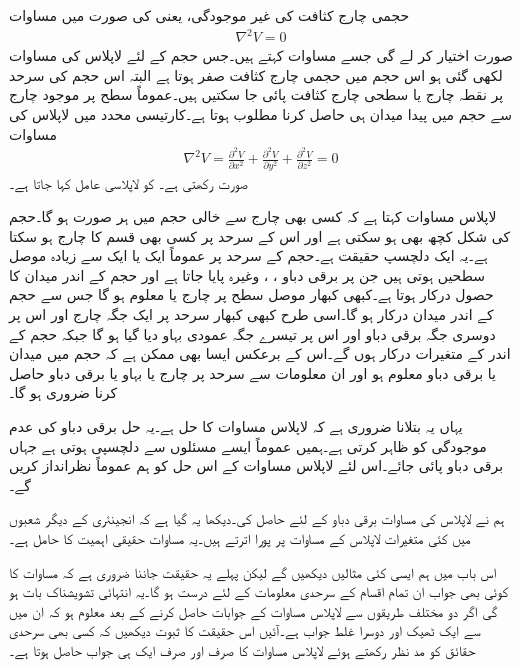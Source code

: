 حجمی چارج کثافت کی غیر موجودگی، یعنی  کی صورت میں مساوات 
\begin{align}\label{مساوات_لاپلاس_لاپلاس_نقطہ_شکل}
\nabla^2 V=0
\end{align}
صورت اختیار کر لے گی جسے  مساوات کہتے ہیں۔جس حجم کے لئے لاپلاس کی مساوات لکھی گئی ہو اس حجم میں حجمی چارج کثافت صفر ہوتا ہے البتہ اس حجم کی سرحد پر نقطہ چارج یا سطحی چارج کثافت پائی جا سکتیں ہیں۔عموماً سطح پر موجود چارج سے حجم میں پیدا میدان ہی حاصل کرنا مطلوب ہوتا ہے۔کارتیسی محدد میں لاپلاس کی مساوات
\begin{align}\label{مساوات_لاپلاس_لاپلاس_کارتیسی_شکل}
\nabla^2 V=\frac{\partial^2 V}{\partial x^2}+\frac{\partial^2 V}{\partial y^2}+\frac{\partial^2 V}{\partial z^2}=0
\end{align}
صورت رکھتی ہے۔ کو لاپلاسی عامل کہا جاتا ہے۔

لاپلاس مساوات کہتا ہے کہ کسی بھی چارج سے خالی حجم میں ہر صورت  ہو گا۔حجم کی شکل کچھ بھی ہو سکتی ہے اور اس کے سرحد پر کسی بھی قسم کا چارج ہو سکتا ہے۔یہ ایک دلچسپ حقیقت ہے۔حجم کے سرحد پر عموماً ایک یا ایک سے زیادہ موصل سطحیں ہوتی ہیں جن پر برقی دباو ، ،  وغیرہ پایا جاتا ہے اور حجم کے اندر میدان کا حصول درکار ہوتا ہے۔کبھی کبھار موصل سطح پر چارج یا  معلوم ہو گا جس سے حجم کے اندر میدان درکار ہو گا۔اسی طرح کبھی کبھار سرحد پر ایک جگہ چارج اور اس پر دوسری جگہ برقی دباو اور اس پر تیسرے  جگہ عمودی بہاو دیا گیا ہو گا جبکہ حجم کے اندر کے متغیرات درکار ہوں گے۔اس کے برعکس ایسا بھی ممکن ہے کہ حجم میں میدان یا برقی دباو معلوم ہو اور ان معلومات سے سرحد پر چارج یا بہاو یا برقی دباو حاصل کرنا ضروری ہو گا۔

یہاں یہ بتلانا ضروری ہے کہ  لاپلاس مساوات کا حل ہے۔یہ حل برقی دباو کی عدم موجودگی کو ظاہر کرتی ہے۔ہمیں عموماً ایسے مسئلوں سے دلچسپی ہوتی ہے جہاں برقی دباو پائی جائے۔اس لئے  لاپلاس مساوات کے اس حل کو ہم عموماً نظرانداز کریں گے۔ 

ہم نے لاپلاس کی مساوات برقی دباو کے لئے حاصل کی۔دیکھا یہ گیا ہے کہ انجینئری کے دیگر شعبوں میں کئی متغیرات لاپلاس کے مساوات پر پورا اترتے ہیں۔یہ مساوات حقیقی اہمیت کا حامل ہے۔ 

اس باب میں ہم ایسی کئی مثالیں دیکھیں گے لیکن پہلے یہ حقیقت جاننا ضروری ہے کہ مساوات  کا کوئی بھی جواب ان تمام اقسام کے سرحدی معلومات کے لئے درست ہو گا۔یہ انتہائی تشویشناک بات ہو گی اگر دو مختلف طریقوں سے لاپلاس مساوات کے جوابات حاصل کرنے کے بعد معلوم ہو کہ ان میں سے ایک ٹھیک اور دوسرا غلط جواب ہے۔آئیں اس حقیقت کا ثبوت دیکھیں کہ کسی بھی سرحدی حقائق کو مد نظر رکھتے ہوئے لاپلاس مساوات کا صرف اور صرف ایک ہی جواب حاصل ہوتا ہے۔


